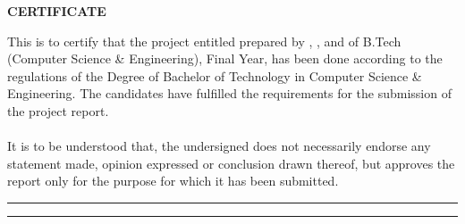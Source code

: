 \begin{center}
 \LARGE {\bf \uppercase{Certificate}}
\end{center}

\vspace{1\baselineskip}

\noindent
This is to certify that the project entitled  prepared by ,  ,  and  of B.Tech (Computer Science \& Engineering), Final Year, has been done according to the regulations of the Degree of
Bachelor of Technology in Computer Science \& Engineering. The candidates have
fulfilled the requirements for the submission of the project report.\\\\
It is to be understood that, the undersigned does not necessarily endorse any statement made, opinion expressed or conclusion drawn thereof, but approves the report only for the purpose for which it has been submitted.

\hspace{\baselineskip}

\vspace{3\baselineskip}
\begin{minipage}[c]{0.45\textwidth}
\centering
\hrule 
\vspace{0.5\baselineskip}
\end{minipage}
\hspace{1.0\baselineskip}
\begin{minipage}[c]{0.45\textwidth}
\centering
\hrule 
\vspace{0.5\baselineskip}
\end{minipage}
\vspace{\baselineskip}
\hspace{1.0\baselineskip}

